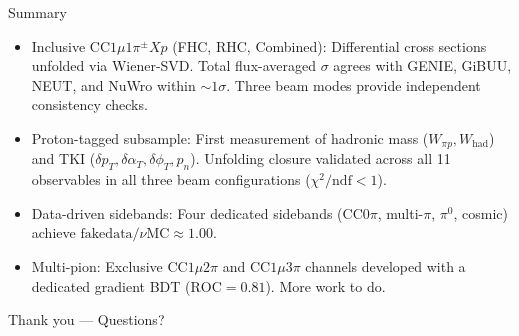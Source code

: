 \documentclass[aspectratio=169,10pt]{beamer}
\begin{document}
\begin{frame}{Summary}
  \begin{itemize}\setlength\itemsep{5pt}
    \item \alert{Inclusive CC$1\mu1\pi^{\pm}Xp$ (FHC, RHC, Combined)}: Differential cross sections unfolded via Wiener-SVD. Total flux-averaged $\sigma$ agrees with GENIE, GiBUU, NEUT, and NuWro within $\sim\!1\sigma$. Three beam modes provide independent consistency checks.
    \item \alert{Proton-tagged subsample}: First measurement of hadronic mass ($W_{\pi p}, W_\mathrm{had}$) and TKI ($\delta p_T, \delta\alpha_T, \delta\phi_T, p_n$). Unfolding closure validated across all 11 observables in all three beam configurations ($\chi^2/\mathrm{ndf} < 1$).
    \item \alert{Data-driven sidebands}: Four dedicated sidebands (CC0$\pi$, multi-$\pi$, $\pi^0$, cosmic) achieve $\mathrm{fake data}/\nu\mathrm{MC} \approx 1.00$.
    \item \alert{Multi-pion}: Exclusive CC$1\mu2\pi$ and CC$1\mu3\pi$ channels developed with a dedicated gradient BDT ($\text{ROC}=0.81$). \alert{More work to do}. 
  \end{itemize}
  \vspace{4mm}
  \centering\color{ubred}\large Thank you --- Questions?
\end{frame}

\appendix
\end{document}
